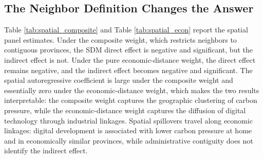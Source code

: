 \documentclass[economies,article,submit,moreauthors]{Definitions/mdpi}
\begin{document}
\subsection{The Neighbor Definition Changes the Answer}

Table \ref{tab:spatial_composite} and Table \ref{tab:spatial_econ} report the spatial panel estimates. Under the composite weight, which restricts neighbors to contiguous provinces, the SDM direct effect is negative and significant, but the indirect effect is not. Under the pure economic-distance weight, the direct effect remains negative, and the indirect effect becomes negative and significant. The spatial autoregressive coefficient is large under the composite weight and essentially zero under the economic-distance weight, which makes the two results interpretable: the composite weight captures the geographic clustering of carbon pressure, while the economic-distance weight captures the diffusion of digital technology through industrial linkages. Spatial spillovers travel along economic linkages: digital development is associated with lower carbon pressure at home and in economically similar provinces, while administrative contiguity does not identify the indirect effect.
\end{document}
